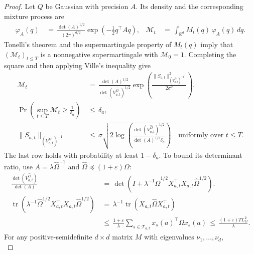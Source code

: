 \documentclass{article} %
\begin{document}
\begin{proof}
Let \(Q\) be Gaussian with precision \(A\). Its density and the corresponding
mixture process are
\begin{equation}
\begin{aligned}
\varphi_A(q)
&\,=\,
\frac{\det(A)^{1/2}}{(2\pi)^{d/2}}
\exp\!\left(-\frac{1}{2}q^\top A q\right),
&
\mathcal{M}_t
&\,=\,
\int_{\mathbb{R}^d} M_t(q)\,\varphi_A(q)\,dq.
\end{aligned}
\end{equation}
Tonelli's theorem and the supermartingale property of \(M_t(q)\) imply that
\((\mathcal{M}_t)_{t\le T}\) is a nonnegative supermartingale with
\(\mathcal{M}_0=1\). Completing the square and then applying Ville's inequality
give
\begin{equation}
\begin{aligned}
\mathcal{M}_t
&\,=\,
\frac{\det(A)^{1/2}}{\det(V_{a,t}^{\widehat\Omega})^{1/2}}
\exp\!\left(
\frac{\|S_{a,t}\|_{(V_{a,t}^{\widehat\Omega})^{-1}}^2}{2\sigma^2}
\right).
\\
\Pr\!\left(\sup_{t\le T}\mathcal{M}_t\ge \frac1{\delta_a}\right)
&\,\leq\,
\delta_a,
\\
\|S_{a,t}\|_{(V_{a,t}^{\widehat\Omega})^{-1}}
&\,\leq\,
\sigma
\sqrt{
2\log\!\left(
\frac{\det(V_{a,t}^{\widehat\Omega})^{1/2}}
{\det(A)^{1/2}\delta_a}
\right)
}
\quad\text{uniformly over \(t\leq T\)}.
\end{aligned}
\end{equation}
The last row holds with probability at least \(1-\delta_a\).
To bound its determinant ratio, use \(A=\lambda\widehat\Omega^{-1}\) and
\(\widehat\Omega\preceq(1+\varepsilon)\Omega\):
\begin{equation}
\begin{aligned}
\frac{\det(V_{a,t}^{\widehat\Omega})}{\det(A)}
&\,=\,
\det\!\left(
I+\lambda^{-1}\widehat\Omega^{1/2}X_{a,t}^\top X_{a,t}\widehat\Omega^{1/2}
\right).
\\
\operatorname{tr}\!\left(
\lambda^{-1}\widehat\Omega^{1/2}X_{a,t}^\top X_{a,t}\widehat\Omega^{1/2}
\right)
&\,=\,
\lambda^{-1}\operatorname{tr}(X_{a,t}\widehat\Omega X_{a,t}^\top)
\\
&\,\leq\,
\frac{1+\varepsilon}{\lambda}
\sum_{s\in\mathcal{T}_{a,t}}x_s(a)^\top\Omega x_s(a)
\,\leq\,
\frac{(1+\varepsilon)TL_\Omega^2}{\lambda}.
\end{aligned}
\end{equation}
For any positive-semidefinite \(d\times d\) matrix \(M\) with eigenvalues
\(\nu_1,\ldots,\nu_d\),
\begin{equation}

\end{equation}
\end{proof}
\end{document}
